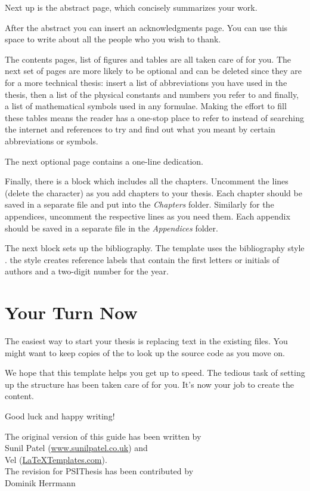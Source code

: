 Next up is the abstract page, which concisely summarizes your work.

After the abstract you can insert an acknowledgments page.
 You can use this space to write about all the people who you wish to thank.

The contents pages,%
list of figures and tables are all taken care of for you. The next set of pages are more likely to be optional and can be deleted since they are for a more technical thesis: insert a list of abbreviations you have used in the thesis, then a list of the physical constants and numbers you refer to and finally, a list of mathematical symbols used in any formulae. Making the effort to fill these tables means the reader has a one-stop place to refer to instead of searching the internet and references to try and find out what you meant by certain abbreviations or symbols.

The next optional page contains a one-line dedication.

Finally, there is a block which includes all the chapters. Uncomment the lines (delete the \code{\%} character) as you add chapters to your thesis. Each chapter should be saved in a separate file and put into the \emph{Chapters} folder. Similarly for the appendices, uncomment the respective lines as you need them. Each appendix should be saved in a separate file in the \emph{Appendices} folder.

The next block sets up the bibliography. The template uses the bibliography style . the  style creates reference labels that contain the first letters or initials of authors and a two-digit number for the year.


\section{Your Turn Now}

The easiest way to start your thesis is replacing text in the existing files. You might want to keep copies of the  to look up the source code as you move on.

We hope that this template helps you get up to speed. The tedious task of setting up the structure has been taken care of for you. It's now your job to create the content.

Good luck and happy writing!

\begin{flushright}
The original version of this guide has been written by\\
Sunil Patel (\href{http://www.sunilpatel.co.uk}{www.sunilpatel.co.uk}) and\\
Vel (\href{http://www.LaTeXTemplates.com}{LaTeXTemplates.com}).\\[2ex]
The revision for PSIThesis has been contributed by\\
Dominik Herrmann
\end{flushright}